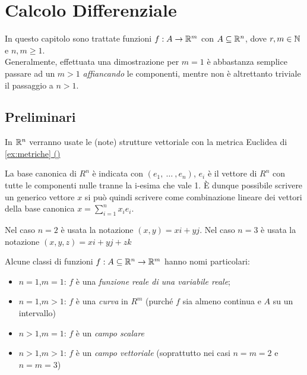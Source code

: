\chapter{Calcolo Differenziale}

In questo capitolo sono trattate funzioni $f: A \to \mathbb{R}^m$ con $A \subseteq \mathbb{R}^n$, dove $r,m \in \mathbb{N}$ e $n,m \geq 1$.\\
Generalmente, effettuata una dimostrazione per $m = 1$ è abbastanza semplice passare ad un $m > 1$ \textit{affiancando} le componenti, mentre non è altrettanto triviale il passaggio a $n > 1$.

\section{Preliminari}
In $\mathbb{R}^n$ verranno usate le (note) strutture vettoriale con la metrica Euclidea di \hyperref[ex:dist_eucl]{\cref*{ex:metriche} ()} %

La base canonica di $R^n$ è indicata con $(e_1,\:\dotsc\:,e_n)$, $e_i$ è il vettore di $R^n$ con tutte le componenti nulle tranne la i-esima che vale 1. È dunque possibile scrivere un generico vettore $x$ si può quindi scrivere come combinazione lineare dei vettori della base canonica $x=\sum\limits_{i=1}^{n} x_i e_i$.

Nel caso $n=2$ è usata la notazione $(x,y)=xi+yj$. Nel caso $n=3$ è usata la notazione $(x,y,z)=xi+yj+zk$

Alcune classi di funzioni $f:A\subseteq\mathbb{R}^n \to\mathbb{R}^m$ hanno nomi particolari:
\begin{itemize}
	\item $n=1$,$m=1$: $f$ è una \textit{funzione reale di una variabile reale};
	\item $n=1$,$m>1$: $f$ è una \textit{curva} in $R^m$ (purché $f$ sia almeno continua e $A$ su un intervallo)
	\item $n>1$,$m=1$: $f$ è un \textit{campo scalare}
	\item $n>1$,$m>1$: $f$ è un \textit{campo vettoriale} (soprattutto nei casi $n=m=2$ e $n=m=3$)
\end{itemize}

\newpage
